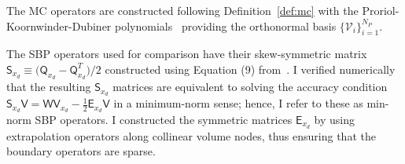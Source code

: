 \documentclass[pdflatex,sn-mathphys-num]{sn-jnl}%
\theoremstyle{thmstyleone}%
\theoremstyle{thmstyletwo}%
\theoremstyle{thmstylethree}%
\newcommand{\mat}[1]{\ensuremath{\mathsf{#1}}}
\newcommand{\fnc}[1]{\ensuremath{\mathcal{#1}}}
\begin{document}
The MC operators are constructed following Definition~\ref{def:mc} with the Proriol-Koornwinder-Dubiner polynomials~\cite{Proriol1957famille,Koornwinder1975two,Dubiner1991spectral} providing the orthonormal basis $\{\fnc{V}_{i}\}_{i=1}^{N_P}$.

The SBP operators used for comparison have their skew-symmetric matrix $\mat{S}_{x_d} \equiv \big( \mat{Q}_{x_d} - \mat{Q}_{x_d}^T\big)/2$ constructed using Equation (9) from~\cite{Hicken2025constructing}.  I verified numerically that the resulting $\mat{S}_{x_d}$ matrices are equivalent to solving the accuracy condition $\mat{S}_{x_d} \mat{V} = \mat{W} \mat{V}_{x_d} - \frac{1}{2} \mat{E}_{x_d} \mat{V}$ in a minimum-norm sense; hence, I refer to these as min-norm SBP operators.  I constructed the symmetric matrices $\mat{E}_{x_d}$ by using extrapolation operators along collinear volume nodes, thus ensuring that the boundary operators are sparse.



\end{document}

